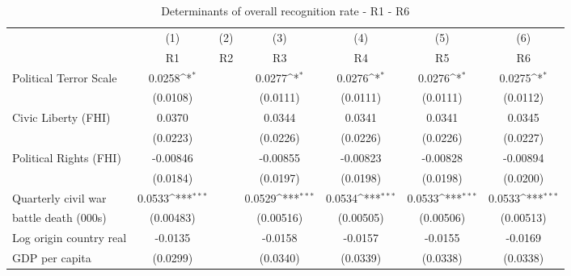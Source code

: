 \begin{table}[!ht]\centering \scriptsize
	\def\sym#1{\ifmmode^{#1}\else\(^{#1}\)\fi}
	\caption{Determinants of overall recognition rate - R1 - R6}
	\begin{tabular}{l*{6}{c}}
		\hline\hline
		&\multicolumn{1}{c}{(1)}     &\multicolumn{1}{c}{(2)}       &\multicolumn{1}{c}{(3)}       &\multicolumn{1}{c}{(4)}    	&\multicolumn{1}{c}{(5)}  	&\multicolumn{1}{c}{(6)}   \\
		&\multicolumn{1}{c}{R1}&\multicolumn{1}{c}{R2}&\multicolumn{1}{c}{R3}&\multicolumn{1}{c}{R4}&\multicolumn{1}{c}{R5}&\multicolumn{1}{c}{R6}\\
\hline
Political Terror Scale&      0.0258\sym{*}  &                     &      0.0277\sym{*}  &      0.0276\sym{*}  &      0.0276\sym{*}  &      0.0275\sym{*}  \\
                    &    (0.0108)         &                     &    (0.0111)         &    (0.0111)         &    (0.0111)         &    (0.0112)         \\
[0,5em]
Civic Liberty (FHI) &      0.0370         &                     &      0.0344         &      0.0341         &      0.0341         &      0.0345         \\
                    &    (0.0223)         &                     &    (0.0226)         &    (0.0226)         &    (0.0226)         &    (0.0227)         \\
[0,5em]
Political Rights (FHI)&    -0.00846         &                     &    -0.00855         &    -0.00823         &    -0.00828         &    -0.00894         \\
                    &    (0.0184)         &                     &    (0.0197)         &    (0.0198)         &    (0.0198)         &    (0.0200)         \\
[0,5em]
Quarterly civil war &      0.0533\sym{***}&                     &      0.0529\sym{***}&      0.0534\sym{***}&      0.0533\sym{***}&      0.0533\sym{***}\\
battle death (000s)                    &   (0.00483)         &                     &   (0.00516)         &   (0.00505)         &   (0.00506)         &   (0.00513)         \\
[0,5em]
Log origin country real &     -0.0135         &                     &     -0.0158         &     -0.0157         &     -0.0155         &     -0.0169         \\
GDP per capita                    &    (0.0299)         &                     &    (0.0340)         &    (0.0339)         &    (0.0338)         &    (0.0338)         \\

\end{tabular}
\end{table}
